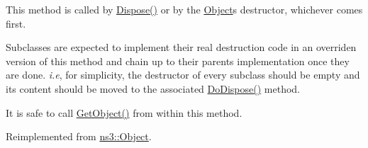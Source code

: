This method is called by \hyperlink{classns3_1_1Object_aa90ae598863f6c251cdab3c3722afdaf}{Dispose()} or by the \hyperlink{classns3_1_1Object}{Object}\textquotesingle{}s destructor, whichever comes first.

Subclasses are expected to implement their real destruction code in an overriden version of this method and chain up to their parent\textquotesingle{}s implementation once they are done. {\itshape i.\+e}, for simplicity, the destructor of every subclass should be empty and its content should be moved to the associated \hyperlink{classns3_1_1Ipv4L3Protocol_ac8a748f7de27c60d87bbda8b10377f53}{Do\+Dispose()} method.

It is safe to call \hyperlink{classns3_1_1Object_a13e18c00017096c8381eb651d5bd0783}{Get\+Object()} from within this method. 

Reimplemented from \hyperlink{classns3_1_1Object_a475d429a75d302d4775f4ae32479b287}{ns3\+::\+Object}.


